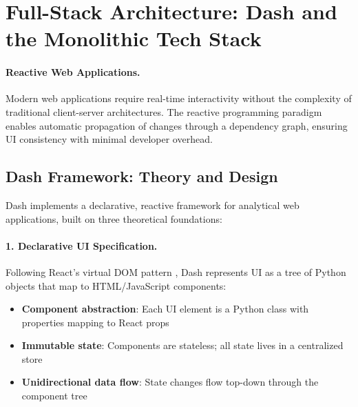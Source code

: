\section{Full-Stack Architecture: Dash and the Monolithic Tech Stack}

\paragraph{Reactive Web Applications.} Modern web applications require real-time interactivity without the complexity of traditional client-server architectures. The reactive programming paradigm \cite{bainomugisha2013survey} enables automatic propagation of changes through a dependency graph, ensuring UI consistency with minimal developer overhead.

\subsection{Dash Framework: Theory and Design}

Dash \cite{plotly2020dash} implements a declarative, reactive framework for analytical web applications, built on three theoretical foundations:

\paragraph{1. Declarative UI Specification.} Following React's virtual DOM pattern \cite{react2013}, Dash represents UI as a tree of Python objects that map to HTML/JavaScript components:
\begin{itemize}[leftmargin=*,itemsep=2pt,topsep=2pt]
 \item \textbf{Component abstraction}: Each UI element is a Python class with properties mapping to React props
 \item \textbf{Immutable state}: Components are stateless; all state lives in a centralized store
 \item \textbf{Unidirectional data flow}: State changes flow top-down through the component tree
\end{itemize}

